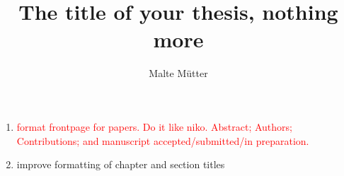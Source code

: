 \documentclass{thesis}
\title{The title of your thesis, nothing more}
\author{Malte Mütter}
\date{} %
\begin{document}
\frontmatter


\begin{summaryspacing}
  \tableofcontents*
\end{summaryspacing}

\pagebreak
\begin{enumerate}
  \item \textcolor{red}{format frontpage for papers. Do it like niko. Abstract; Authors; Contributions; and manuscript accepted/submitted/in preparation.}
  \item improve formatting of chapter and section titles
\end{enumerate}


\mainmatter





%
%
%
\end{document}
